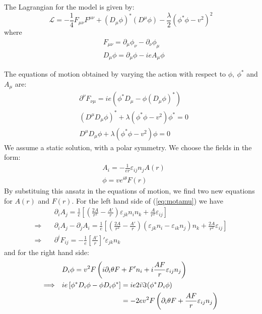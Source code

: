 The Lagrangian for the model is given by:
\begin{equation}
  \mathcal{L} = -\frac{1}{4}F_{\mu\nu}F^{\mu\nu} +\left(D_\mu\phi\right)^*\left(D^\mu\phi\right)-\frac{\lambda}{2}\left(\phi^*\phi-v^2\right)^2
\end{equation}
where
\begin{align}
  &F_{\mu\nu} = \partial_\mu\phi_\nu-\partial_\nu\phi_\mu\\
  &D_\mu\phi = \partial_\mu \phi - ieA_\mu\phi
\end{align}

The equations of motion obtained by varying the action with respect to
$\phi,\ \phi^*$ and $A_\mu$ are:
\begin{align}
  & \partial^\nu F_{\nu\mu} = ie\left(\phi^*D_{\mu}-\phi\left(D_\mu\phi\right)^*\right)\label{eq:motamu}\\
  & \left(D^\mu D_\mu \phi\right)^*+\lambda\left(\phi^*\phi-v^2\right)\phi^* = 0\label{eq:phistar}\\
  & D^\mu D_\mu \phi+\lambda\left(\phi^*\phi-v^2\right)\phi = 0\label{eq:phi}
\end{align}
We assume a static solution, with a polar symmetry. We choose the
fields in the form:
\begin{align}
  &A_i = -\frac{1}{er}\varepsilon_{ij}n_j A(r)\\
  &\phi = ve^{i\theta}F(r)
\end{align}
By substituing this ansatz in the equations of motion, we find two new
equations for $A(r)$ and $F(r)$. For the left hand side of (\ref{eq:motamu})
we have
\begin{align}
  &\partial_iA_j = \frac{1}{e}\left[\left(\frac{2A}{r^2}-\frac{A'}{r}\right)\varepsilon_{jk}n_in_k+\frac{A}{r^2}\varepsilon_{ij}\right]\\
  \Longrightarrow\quad& \partial_iA_j-\partial_jA_i = \frac{1}{e}\left[\left(\frac{2A}{r^2}-\frac{A'}{r}\right)\left(\varepsilon_{jk}n_i-\varepsilon_{ik}n_j\right)n_k+\frac{2A}{r^2}\varepsilon_{ij}\right]\\
  \Longrightarrow\quad& \partial^iF_{ij} = -\frac{1}{e}\left[\frac{A'}{r}\right]' \varepsilon_{jk}n_k
\end{align}
and for the right hand side:
\begin{align}
  &D_i \phi = v^2F\left(i\partial_i\theta F+F'n_i+i\frac{AF}{r}\varepsilon_{ij}n_j\right)\\
  \Longrightarrow\quad&ie\left[\phi^*D_i\phi-\phi D_i\phi^*\right] = ie2i\Im(\phi^*D_i\phi)\\
  &\hphantom{ie\left[\phi^*D_i\phi-\phi D_i\phi^*\right]} = -2ev^2F\left(\partial_i\theta F+\frac{AF}{r}\varepsilon_{ij}n_j\right)
\end{align}
